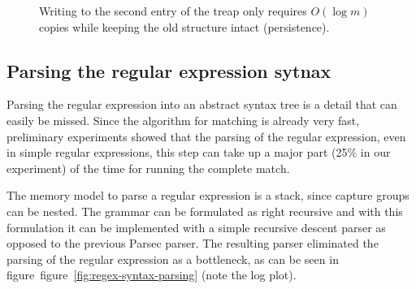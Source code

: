 \documentclass[english,twocolumn]{article}
\theoremstyle{definition}
\newcommand{\Figref}[1]{figure~\ref{fig:#1}}
\newcommand{\figlabel}[1]{\label{fig:#1}}
\newcommand{\seclabel}[1]{\label{sec:#1}}
\begin{document}
\begin{figure}
\caption{\figlabel{treap}Writing to the second entry of the treap only requires $O(\log m)$ copies while keeping the old structure intact (persistence).}
\end{figure}

\subsection{Parsing the regular expression sytnax}  \seclabel{regex-syntax}
Parsing the regular expression into an abstract syntax tree is a detail that
can easily be missed. Since the algorithm for matching is already very fast,
preliminary experiments showed that the parsing of the regular expression, even
in simple regular expressions, this step can take up a major part (25\% in our
experiment) of the time for running the complete match.

The memory model to parse a regular expression is a stack, since capture groups
can be nested. The grammar can be formulated as right recursive and with this
formulation it can be implemented with a simple recursive descent parser as 
opposed to the previous Parsec parser. The resulting parser eliminated the 
parsing of the regular expression as a bottleneck, as can be seen in
figure~\Figref{regex-syntax-parsing} (note the log plot).
\end{document}
